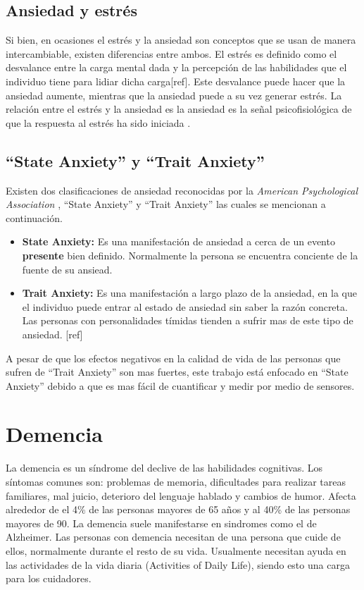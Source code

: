\subsection{Ansiedad y estr\'es}\label{secc:anxietyandstress}
Si bien, en ocasiones el estr\'es y la ansiedad son conceptos que se usan de manera intercambiable, existen diferencias entre ambos. El estr\'es es definido como el desvalance entre la carga mental dada y la percepci\'on de las habilidades que el individuo tiene para lidiar dicha carga[ref]. Este desvalance puede hacer que la ansiedad aumente, mientras que la ansiedad puede a su vez generar estr\'es. La relaci\'on entre el estr\'es y la ansiedad es la ansiedad es la se\~nal psicofisiol\'ogica de que la respuesta al estr\'es ha sido iniciada \citep{PMID2235645}.


\subsection{``State Anxiety'' y ``Trait Anxiety''}\label{secc:anxieystatevstrait}
Existen dos clasificaciones de ansiedad reconocidas por la \textit{American Psychological Association} \citep{psychologyapa} , ``State Anxiety'' y ``Trait Anxiety'' las cuales se mencionan a continuaci\'on.

\begin{itemize}
	\item{\textbf{State Anxiety:}} Es una manifestaci\'on de ansiedad a cerca de un evento \textbf{presente} bien definido. Normalmente la persona se encuentra conciente de la fuente de su ansiead. 
	\item{\textbf{Trait Anxiety:}} Es una manifestaci\'on a largo plazo de la ansiedad, en la que el individuo puede entrar al estado de ansiedad sin saber la raz\'on concreta. Las personas con personalidades t\'imidas tienden a sufrir mas de este tipo de ansiedad. [ref]

\end{itemize}

A pesar de que los efectos negativos en la calidad de vida de las personas que sufren de ``Trait Anxiety'' son mas fuertes, este trabajo est\'a enfocado en ``State Anxiety'' debido a que es mas f\'acil de cuantificar y medir por medio de sensores.

\section{Demencia}\label{secc:dementia}
La demencia es un s\'indrome del declive de las habilidades cognitivas. Los s\'intomas comunes son: problemas de memoria, dificultades para realizar tareas familiares, mal juicio, deterioro del lenguaje hablado y cambios de humor\citep{Aziz}. Afecta alrededor de el 4\% de las personas mayores de 65 a\~nos y al 40\% de las personas mayores de 90. La demencia suele manifestarse en sindromes como el de Alzheimer. Las personas con demencia necesitan de una persona que cuide de ellos, normalmente durante el resto de su vida. Usualmente necesitan ayuda en las actividades de la vida diaria (Activities of Daily Life), siendo esto una carga para los cuidadores.

